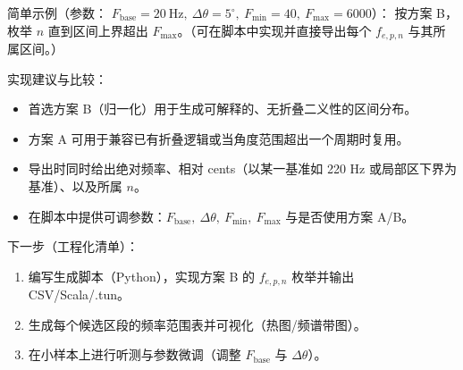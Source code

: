 \documentclass{article}
\begin{document}
简单示例（参数： \(F_{\mathrm{base}}=20\ \mathrm{Hz},\ \Delta\theta=5^\circ,\ F_{\min}=40,\ F_{\max}=6000\)）：
按方案 B，枚举 \(n\) 直到区间上界超出 \(F_{\max}\)。（可在脚本中实现并直接导出每个 \(f_{e,p,n}\) 与其所属区间。）

实现建议与比较：
\begin{itemize}
  \item 首选方案 B（归一化）用于生成可解释的、无折叠二义性的区间分布。
  \item 方案 A 可用于兼容已有折叠逻辑或当角度范围超出一个周期时复用。
  \item 导出时同时给出绝对频率、相对 cents（以某一基准如 220 Hz 或局部区下界为基准）、以及所属 \(n\)。
  \item 在脚本中提供可调参数：\(F_{\mathrm{base}},\ \Delta\theta,\ F_{\min},\ F_{\max}\) 与是否使用方案 A/B。
\end{itemize}

下一步（工程化清单）：
\begin{enumerate}
  \item 编写生成脚本（Python），实现方案 B 的 \(f_{e,p,n}\) 枚举并输出 CSV/Scala/.tun。
  \item 生成每个候选区段的频率范围表并可视化（热图/频谱带图）。
  \item 在小样本上进行听测与参数微调（调整 \(F_{\mathrm{base}}\) 与 \(\Delta\theta\)）。
\end{enumerate}
\end{document}

